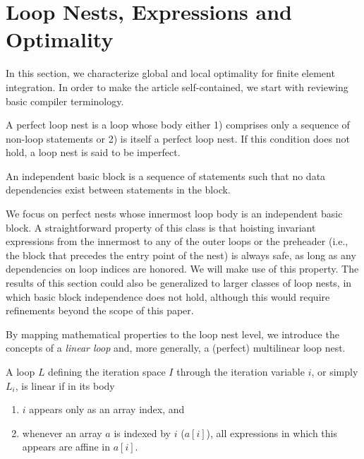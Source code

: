 

\section{Loop Nests, Expressions and Optimality}
\label{sec:lnopt}
In this section, we characterize global and local optimality for finite element integration. In order to make the article self-contained, we start with reviewing basic compiler terminology.

\begin{Def}
A perfect loop nest is a loop whose body either 1) comprises only a sequence
of non-loop statements or 2) is itself a perfect loop nest. If this
condition does not hold, a loop nest is said to be imperfect. 
\end{Def}

\begin{Def}
An independent basic block is a sequence of statements such that no data
dependencies exist between statements in the block.
\end{Def}

We focus on perfect nests whose innermost loop body is an independent basic
block. A straightforward property of this class is that hoisting invariant
expressions from the innermost to any of the outer loops or the preheader
(i.e., the block that precedes the entry point of the nest) is always safe,
as long as any dependencies on loop indices are honored. We will make use of this property. The results of this section could also be generalized to larger classes of loop nests, in which basic block independence does not hold, although this would require refinements beyond the scope of this paper. 

By mapping mathematical properties to the loop nest level, we introduce the
concepts of a \textit{linear loop} and, more generally, a (perfect) multilinear loop nest.

\begin{Def}
\label{def:linear-loop}
A loop $L$ defining the iteration space $I$ through the iteration variable $i$, or simply $L_i$, is linear if in its body
\begin{enumerate}
\item $i$ appears only as an array index, and
\item whenever an array $a$ is indexed by $i$ ($a[i]$), all expressions in which this appears are affine in $a[i]$.
\end{enumerate}
\end{Def}

